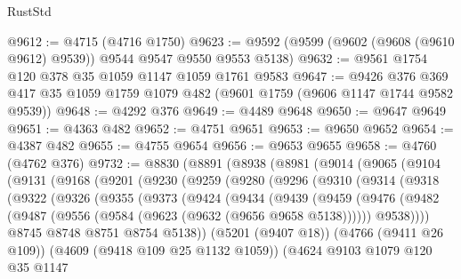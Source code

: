\begin{lexlean}{RustStd}
\begin{coremodule}
{\begin{coremodule}
{{{{{{{{{{{{{{{{{{{{{{{{{{{{{{{{{{{@9612 := @4715 (@4716 @1750)
@9623 := @9592 (@9599 (@9602 (@9608 (@9610 @9612) @9539)) @9544 @9547 @9550 @9553 @5138)
@9632 := @9561 @1754 @120 @378 @35 @1059 @1147 @1059 @1761 @9583
@9647 := @9426
    @376
    @369
    @417
    @35
    @1059
    @1759
    @1079
    @482
    (@9601 @1759 (@9606 @1147 @1744 @9582 @9539))
@9648 := @4292 @376
@9649 := @4489 @9648
@9650 := @9647 @9649
@9651 := @4363 @482
@9652 := @4751 @9651
@9653 := @9650 @9652
@9654 := @4387 @482
@9655 := @4755 @9654
@9656 := @9653 @9655
@9658 := @4760 (@4762 @376)
@9732 := @8830
    (@8891
      (@8938
        (@8981
          (@9014
            (@9065
              (@9104
                (@9131
                  (@9168
                    (@9201
                      (@9230
                        (@9259
                          (@9280
                            (@9296
                              (@9310
                                (@9314
                                  (@9318
                                    (@9322
                                      (@9326
                                        (@9355
                                          (@9373
                                            (@9424
                                              (@9434
                                                (@9439
                                                  (@9459
                                                    (@9476
                                                      (@9482
                                                        (@9487
                                                          (@9556
                                                            (@9584
                                                              (@9623 (@9632 (@9656 @9658 @5138))))))
                                                        @9538))))
                                                @8745
                                                @8748
                                                @8751
                                                @8754
                                                @5138))
                                            (@5201 (@9407 @18))
                                            (@4766 (@9411 @26 @109))
                                            (@4609 (@9418 @109 @25 @1132 @1059))
                                            (@4624
                                              @9103
                                              @1079
                                              @120
                                              @35
                                              @1147
}}}}}}}}}}}}}}}}}}}}}}}}}}}}}}}}}}}
\end{coremodule}}
\end{coremodule}
\end{lexlean}
